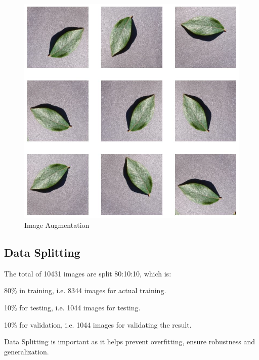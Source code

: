 \begin{figure}
    \centering
    \includegraphics[width=1\linewidth]{graphics//chapter 4/image aug.png}
    \caption{Image Augmentation}
    \label{fig:img-augmentation}
\end{figure}


\subsection{Data Splitting}
The total of 10431 images are split 80:10:10, which is:\par
80\% in training, i.e. 8344 images for actual training.\par
10\% for testing, i.e. 1044 images for testing.\par
10\% for validation, i.e. 1044 images for validating the result.\par \vspace{1em}

Data Splitting is important as it helps prevent overfitting, ensure robustness and generalization.


